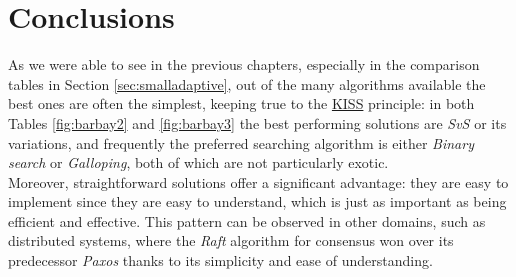 \chapter{Conclusions\label{conclusions}}

As we were able to see in the previous chapters, especially in the comparison tables in Section \ref{sec:smalladaptive}, out of the many algorithms available the best ones are often the simplest, keeping true to the \href{https://en.wikipedia.org/wiki/KISS_principle}{KISS} principle: in both Tables \ref{fig:barbay2} and \ref{fig:barbay3} the best performing solutions are \textit{SvS} or its variations, and frequently the preferred searching algorithm is either \textit{Binary search} or \textit{Galloping}, both of which are not particularly exotic. \\
Moreover, straightforward solutions offer a significant advantage: they are easy to implement since they are easy to understand, which is just as important as being efficient and effective. This pattern can be observed in other domains, such as distributed systems, where the \textit{Raft} algorithm for consensus \citep{raft} won over its predecessor \textit{Paxos} \citep{paxos} thanks to its simplicity and ease of understanding. 

